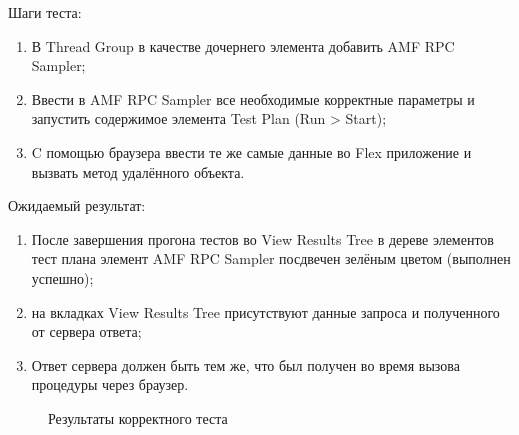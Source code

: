 Шаги теста:

\begin{enumerate}
\item В Thread Group в качестве дочернего элемента добавить AMF RPC Sampler;
\item Ввести в AMF RPC Sampler все необходимые корректные параметры и запустить содержимое элемента Test Plan (Run > Start);
\item C помощью браузера ввести те же самые данные во Flex приложение и вызвать метод удалённого объекта.
\end{enumerate}

Ожидаемый результат:

\begin{enumerate}
\item После завершения прогона тестов во View Results Tree в дереве элементов тест плана элемент AMF RPC Sampler
посдвечен зелёным цветом (выполнен успешно);
\item на вкладках View Results Tree присутствуют данные запроса и полученного от сервера ответа;
\item Ответ сервера должен быть тем же, что был получен во время вызова процедуры через браузер.
\end{enumerate}

\begin{figure}[ht]
\caption{Результаты корректного теста}
\label{ris:positiveTest.png}
\end{figure}

